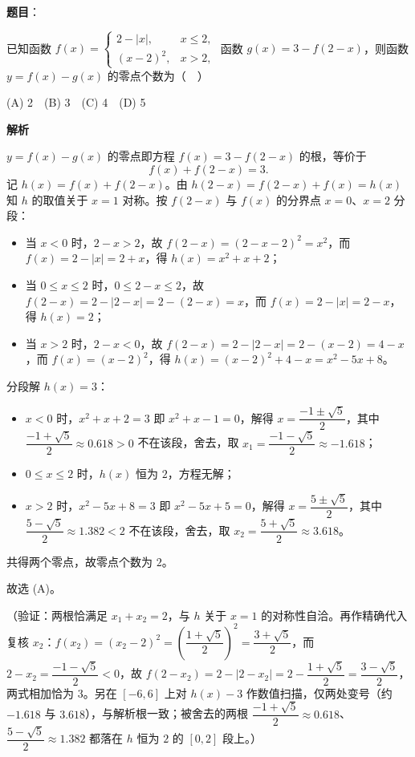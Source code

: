 \begin{answer}

\textbf{题目}：

已知函数 $f(x)=\begin{cases}2-|x|,&x\leqslant2,\\(x-2)^2,&x>2,\end{cases}$ 函数 \(g(x)=3-f(2-x)\)，则函数 \(y=f(x)-g(x)\) 的零点个数为（　）

(A) 2　(B) 3　(C) 4　(D) 5

\textbf{解析}

\(y=f(x)-g(x)\) 的零点即方程 \(f(x)=3-f(2-x)\) 的根，等价于
\nopagebreak[4]
\[
f(x)+f(2-x)=3.
\]
记 \(h(x)=f(x)+f(2-x)\)。由 \(h(2-x)=f(2-x)+f(x)=h(x)\) 知 \(h\) 的取值关于 \(x=1\) 对称。按 \(f(2-x)\) 与 \(f(x)\) 的分界点 \(x=0\)、\(x=2\) 分段：

\begin{itemize}
\item 当 \(x<0\) 时，\(2-x>2\)，故 \(f(2-x)=(2-x-2)^2=x^2\)，而 \(f(x)=2-|x|=2+x\)，得 \(h(x)=x^2+x+2\)；
\item 当 \(0\leqslant x\leqslant 2\) 时，\(0\leqslant 2-x\leqslant 2\)，故 \(f(2-x)=2-|2-x|=2-(2-x)=x\)，而 \(f(x)=2-|x|=2-x\)，得 \(h(x)=2\)；
\item 当 \(x>2\) 时，\(2-x<0\)，故 \(f(2-x)=2-|2-x|=2-(x-2)=4-x\)，而 \(f(x)=(x-2)^2\)，得 \(h(x)=(x-2)^2+4-x=x^2-5x+8\)。
\end{itemize}

分段解 \(h(x)=3\)：

\begin{itemize}
\item \(x<0\) 时，\(x^2+x+2=3\) 即 \(x^2+x-1=0\)，解得 \(x=\dfrac{-1\pm\sqrt5}{2}\)，其中 \(\dfrac{-1+\sqrt5}{2}\approx 0.618>0\) 不在该段，舍去，取 \(x_1=\dfrac{-1-\sqrt5}{2}\approx -1.618\)；
\item \(0\leqslant x\leqslant 2\) 时，\(h(x)\) 恒为 \(2\)，方程无解；
\item \(x>2\) 时，\(x^2-5x+8=3\) 即 \(x^2-5x+5=0\)，解得 \(x=\dfrac{5\pm\sqrt5}{2}\)，其中 \(\dfrac{5-\sqrt5}{2}\approx 1.382<2\) 不在该段，舍去，取 \(x_2=\dfrac{5+\sqrt5}{2}\approx 3.618\)。
\end{itemize}

共得两个零点，故零点个数为 \(2\)。

故选 (A)。

（验证：两根恰满足 \(x_1+x_2=2\)，与 \(h\) 关于 \(x=1\) 的对称性自洽。再作精确代入复核 \(x_2\)：\(f(x_2)=(x_2-2)^2=\left(\dfrac{1+\sqrt5}{2}\right)^2=\dfrac{3+\sqrt5}{2}\)，而 \(2-x_2=\dfrac{-1-\sqrt5}{2}<0\)，故 \(f(2-x_2)=2-|2-x_2|=2-\dfrac{1+\sqrt5}{2}=\dfrac{3-\sqrt5}{2}\)，两式相加恰为 \(3\)。另在 \([-6,6]\) 上对 \(h(x)-3\) 作数值扫描，仅两处变号（约 \(-1.618\) 与 \(3.618\)），与解析根一致；被舍去的两根 \(\dfrac{-1+\sqrt5}{2}\approx 0.618\)、\(\dfrac{5-\sqrt5}{2}\approx 1.382\) 都落在 \(h\) 恒为 \(2\) 的 \([0,2]\) 段上。）


\end{answer}
